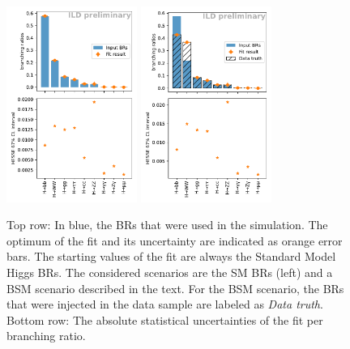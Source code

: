 \documentclass[a4paper,11pt]{article}
\begin{document}
\begin{figure}[ht]
    \centering
    \includegraphics[width=0.38\textwidth, keepaspectratio]{br_estimates}
    \includegraphics[width=0.38\textwidth, keepaspectratio]{changed_br_estimates}
    \caption{
        Top row: In blue, the BRs that were used in the simulation.
        The optimum of the fit and its uncertainty are indicated as orange error bars.
        The starting values of the fit are always the Standard Model Higgs BRs.
        The considered scenarios are the SM BRs (left)
        and a BSM scenario described in the text.
        For the BSM scenario, the BRs that were injected in the data sample
        are labeled as \textit{Data truth}.
        \\
        Bottom row: The absolute statistical uncertainties
        of the fit per branching ratio.
    }\label{fig:brs}
\end{figure}
\end{document}

